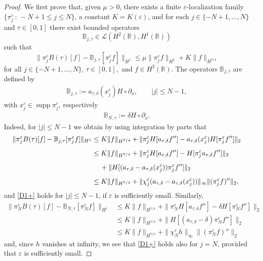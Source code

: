 \documentclass[11pt,reqno]{amsart}
\numberwithin{equation}{section}
\newcommand{\0}{\Omega}
\newcommand{\e}{\varepsilon}
\newcommand{\p}{\partial}
\newcommand{\bB}{\mathbb{B}}
\newcommand{\kL}{\mathcal{L}}
\newcommand{\R}{\mathbb{R}}
\DeclareMathOperator{\supp}{supp}
\numberwithin{equation}{section}
\begin{document}
\begin{proof}
We first prove that, given $\mu>0$, there exists a finite $\e$-localization family  $\{\pi_j^\e\,:\, -N+1\leq j\leq N\}$, a constant $K=K(\e)$, 
and for each  $ j\in\{-N+1,\ldots,N\}$ and $\tau\in[0,1]$ there 
exist bounded operators $$\bB_{ j,\tau}\in\kL(H^2(\R), H^1(\R))$$
 such that 
 \begin{equation}\label{D1+}
  \|\pi_j^\e B(\tau) [f]-\bB_{j,\tau}[\pi^\e_j f]\|_{H^1}\leq \mu \|\pi_j^\e f\|_{H^2}+K\|  f\|_{H^{7/4}}
 \end{equation}
 for all $ j\in\{-N+1,\ldots,N\}$, $\tau\in[0,1],$ and  $f\in H^2(\R)$. 
 The operators $\bB_{j,\tau}$ are defined  by 
  \begin{align*} 
 \bB_{j,\tau }:= a_{\tau,\delta}(x_j^\e)H\circ \p_x, \qquad |j|\leq N-1, 
 \end{align*}
 with $x_j^\e\in\supp  \pi_j^\e$, respectively
\begin{align*} 
 \bB_{N,\tau }:= \delta H\circ \p_x. 
 \end{align*}
 Indeed, for $|j|\leq N-1$ we obtain by using integration by parts that
 \begin{align*}
    \|\pi_j^\e B(\tau) [f]-\bB_{j,\tau}[\pi^\e_j f]\|_{H^1}&\leq K\|f\|_{H^{7/4}}+\|\pi_j^\e H[ a_{\tau,\delta} f'']-a_{\tau,\delta}(x_j^\e)H[\pi_j^\e f'']\|_2\\[1ex]
    &\leq K\|f\|_{H^{7/4}}+\|\pi_j^\e H[ a_{\tau,\delta} f'']- H[ \pi_j^\e a_{\tau,\delta} f'']\|_2\\[1ex]
    &\hspace{0.424cm}+\|H[( a_{\tau,\delta}  -a_{\tau,\delta}(x_j^\e))\pi_j^\e f'']\|_2\\[1ex]
    &   \leq K\|f\|_{H^{7/4}}+\|\chi_j^\e( a_{\tau,\delta}  -a_{\tau,\delta}(x_j^\e))\|_\infty \|(\pi_j^\e f)''\|_2,
 \end{align*}
and \eqref{D1+} holds for $|j|\leq N-1$, if $\e$ is sufficiently small. Similarly,
\begin{align*}
    \|\pi_N^\e B(\tau) [f]-\bB_{N,\tau}[\pi^\e_N f]\|_{H^1}&\leq K\|f\|_{H^{7/4}}+\|\pi_N^\e H[ a_{\tau,\delta} f'']-\delta H[\pi_N^\e f'']\|_2\\[1ex]
    &\leq K\|f\|_{H^{7/4}}+\|H[( a_{\tau,\delta}  -\delta )\pi_N^\e f'']\|_2\\[1ex]
     &  \leq K\|f\|_{H^{7/4}}+\|\chi_N^\e h\|_\infty \|(\pi_N^\e f)''\|_2
 \end{align*}
 and, since $h$ vanishes at infinity, we see that \eqref{D1+} holds also for $j=N$, provided that  $\e$ is sufficiently small.
 

\end{proof}
\end{document}

